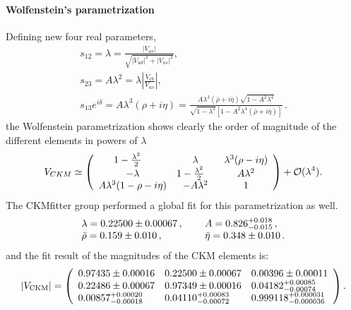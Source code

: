 \paragraph*{Wolfenstein's parametrization}
Defining new four real parameters, 
\begin{gather}
    s_{12}=\lambda={\frac{|V_{u s}|}{\sqrt{|V_{u d}|^{2}+|V_{u s}|^{2}}}} ,\\
    s_{23}=A\lambda^{2}=\lambda|\frac{V_{c b}}{V_{u s}}|,\\
    s_{13}e^{i\delta}=A\lambda^{3}(\rho+i\eta)=\frac{A\lambda^{3}(\bar{\rho}+i\bar{\eta})\sqrt{1-A^{2}\lambda^{4}}}{\sqrt{1-\lambda^{2}}\left[1-A^{2}\lambda^{4}(\bar{\rho}+i\bar{\eta})\right]}\,
.
\end{gather}
the Wolfenstein parametrization shows clearly the order of magnitude of the different elements in powers of $\lambda$
\begin{equation}
    V_{C K M}\simeq\left(\begin{array}{c c c}{{1-\frac{\lambda^{2}}2\ \ \ }}&{{\lambda}}&{{\lambda^{3}(\rho-i\eta)}}\\ {{-\lambda}}&{{1-\frac{\lambda^{2}}2\ \ \ }}&{{A\lambda^{2}}}\\ {{A\lambda^{3}(1-\rho-i\eta)}}&{{-A\lambda^{2}}}&{{1}}\end{array}\right)+{\cal O}(\lambda^{4}).
\end{equation}
The CKMfitter group performed a global fit for this parametrization as well.
\begin{equation}
    \begin{array}{l l}{{\lambda=0.22500\pm0.00067\,,~~~~}}&{{A=0.826_{-0.015}^{+0.018}\,,}}\\ {{\bar{\rho}=0.159\pm0.010\,{,~~~}}}&{{\bar{\eta}=0.348\pm0.010\,.}}\end{array}
\end{equation}
and the fit result of the magnitudes of the CKM elements is:
\begin{equation}
|V_{\mathrm{CKM}}|=\left(\begin{array}{l l l}{{0.97435\pm0.00016}}&{{0.22500\pm0.00067}} & {{0.00396\pm0.00011}}\\ {{0.22486\pm0.00067}}&{{0.97349\pm0.00016}}&{{0.04182^{+0.00085}_{-0.00074}}}\\ {{0.00857_{-0.00018}^{+0.00020}}}&{{0.04110_{-0.00072}^{+0.00083}}}&{{0.999118^{+0.000031}_{-0.000036}}}\end{array}\right).
\end{equation}
